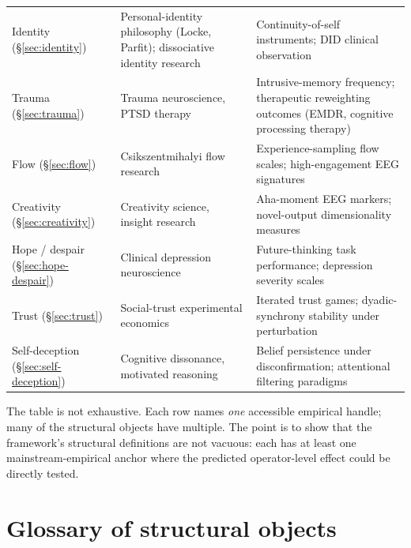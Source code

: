 \documentclass[11pt]{article}
\theoremstyle{plain}
\theoremstyle{definition}
\theoremstyle{remark}
\begin{document}
\begin{table}[h]
\begin{tabular}{p{2.6cm}p{3.2cm}p{6.4cm}}
Identity (\S\ref{sec:identity}) & Personal-identity philosophy (Locke, Parfit); dissociative identity research & Continuity-of-self instruments; DID clinical observation \\
Trauma (\S\ref{sec:trauma}) & Trauma neuroscience, PTSD therapy & Intrusive-memory frequency; therapeutic reweighting outcomes (EMDR, cognitive processing therapy) \\
Flow (\S\ref{sec:flow}) & Csikszentmihalyi flow research & Experience-sampling flow scales; high-engagement EEG signatures \\
Creativity (\S\ref{sec:creativity}) & Creativity science, insight research & Aha-moment EEG markers; novel-output dimensionality measures \\
Hope / despair (\S\ref{sec:hope-despair}) & Clinical depression neuroscience & Future-thinking task performance; depression severity scales \\
Trust (\S\ref{sec:trust}) & Social-trust experimental economics & Iterated trust games; dyadic-synchrony stability under perturbation \\
Self-deception (\S\ref{sec:self-deception}) & Cognitive dissonance, motivated reasoning & Belief persistence under disconfirmation; attentional filtering paradigms \\
\bottomrule
\end{tabular}
\end{table}

The table is not exhaustive. Each row names \emph{one} accessible empirical handle; many of the structural objects have multiple. The point is to show that the framework's structural definitions are not vacuous: each has at least one mainstream-empirical anchor where the predicted operator-level effect could be directly tested.

\section{Glossary of structural objects}\label{sec:glossary}
\end{document}
